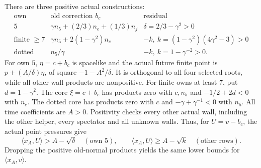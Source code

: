 \documentclass[11pt]{article}
\theoremstyle{definition}
\theoremstyle{remark}
\newcommand{\ip}[2]{\langle #1,#2\rangle}
\begin{document}
There are three positive actual constructions:
\[
\begin{array}{c|c|c}
\text{own}&\text{old correction }b_c&\text{residual}\\ \hline
5&\gamma n_5+(2/3)n_e+(1/3)n_j&
 \delta=2/3-\gamma^2>0\\
\text{finite }\geq7&\gamma n_5+2(1-\gamma^2)n_e&
 -k,\ k=(1-\gamma^2)(4\gamma^2-3)>0\\
\text{dotted}&n_5/\gamma&-k,\ k=1-\gamma^{-2}>0.
\end{array}
\]
For own \(5\), \(\eta=c+b_c\) is spacelike and the
actual future finite point is
\(p+(A/\delta)\eta\), of square \(-1-A^2/\delta\).
It is orthogonal to all four selected roots, while
all other wall products are nonpositive.
For finite owns at least \(7\), put \(d=1-\gamma^2\).
The core \(\xi=c+b_c\) has products zero with \(c,n_5\)
and \(-1/2+2d<0\) with \(n_e\).
The dotted core has products zero with \(c\) and
\(-\gamma+\gamma^{-1}<0\) with \(n_5\).
All time coefficients are \(A>0\). Positivity checks
every other actual wall, including the other helper,
every spectator and all unknown walls.
Thus, for \(U=v-b_c\), the actual point pressures give
\begin{equation}\label{app:eq:Acorepressure}
 \ip{x_A}{U}>A-\sqrt{\delta}\quad(\text{own }5),
 \qquad
 \ip{x_A}{U}\geq A-\sqrt{k}\quad(\text{other rows}).
\end{equation}
Dropping the positive old-normal products yields
the same lower bounds for \(\ip{x_A}{v}\).
\end{document}
